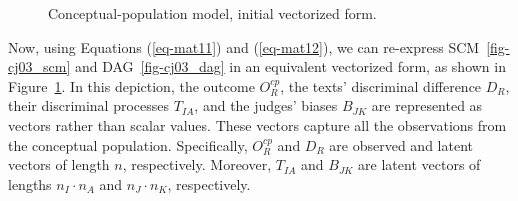 \documentclass[
  authoryear,
  review,
  1p]{elsarticle}
\begin{document}
\begin{figure}[H]

\begin{minipage}{\linewidth}

\centering{

\[
\begin{aligned}
  O^{cp}_{R} & := f_{O}(D_{R}) \\
  D_{R} & := f_{D}(T_{IA}, B_{JK})
\end{aligned}
\]

}


\end{minipage}%
\newline
\begin{minipage}{\linewidth}



\end{minipage}%

\caption{\label{fig-cj04}Conceptual-population model, initial vectorized
form.}

\end{figure}%

Now, using Equations (\ref{eq-mat11}) and (\ref{eq-mat12}), we can
re-express SCM~\ref{fig-cj03_scm} and DAG~\ref{fig-cj03_dag} in an
equivalent vectorized form, as shown in Figure~\ref{fig-cj04}. In this
depiction, the outcome \(O^{cp}_{R}\), the texts' discriminal difference
\(D_{R}\), their discriminal processes \(T_{IA}\), and the judges'
biases \(B_{JK}\) are represented as vectors rather than scalar values.
These vectors capture all the observations from the conceptual
population. Specifically, \(O^{cp}_{R}\) and \(D_{R}\) are observed and
latent vectors of length \(n\), respectively. Moreover, \(T_{IA}\) and
\(B_{JK}\) are latent vectors of lengths \(n_{I} \cdot n_{A}\) and
\(n_{J} \cdot n_{K}\), respectively.
\end{document}

